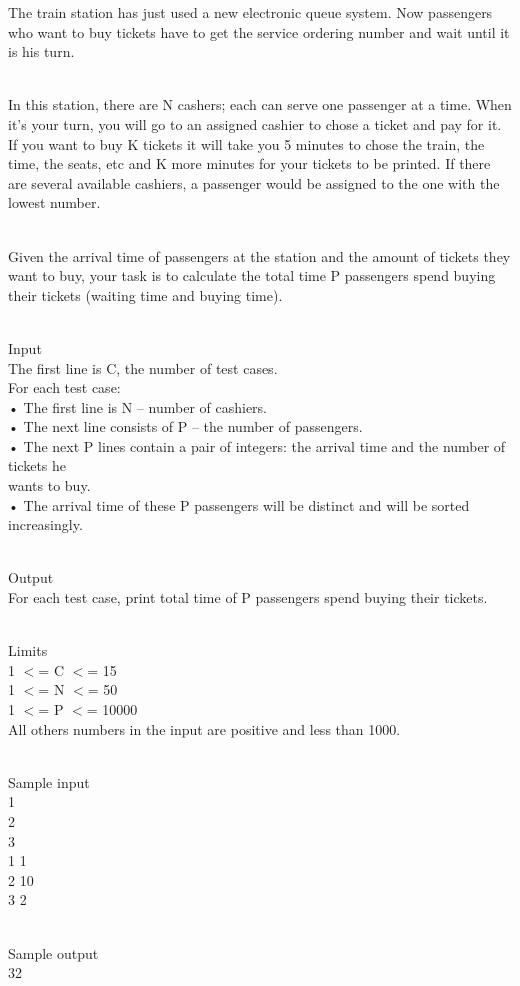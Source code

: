



   The train station has just used a new electronic queue system. Now passengers who want to buy tickets have to get the service ordering number and wait until it is his turn.  


\\   In this station, there are N cashers; each can serve one passenger at a time. When it’s your turn, you will go to an assigned cashier to chose a ticket and pay for it. If you want to buy K tickets it will take you 5 minutes to chose the train, the time, the seats, etc and K more minutes for your tickets to be printed. If there are several available cashiers, a passenger would be assigned to the one with the lowest number.  


\\   Given the arrival time of passengers at the station and the amount of tickets they want to buy, your task is to calculate the total time P passengers spend buying their tickets (waiting time and buying time).  


\\   Input   
\\   The first line is C, the number of test cases.   
\\   For each test case:   
\\   • The first line is N – number of cashiers.   
\\   • The next line consists of P – the number of passengers.   
\\   • The next P lines contain a pair of integers: the arrival time and the number of tickets he   
\\   wants to buy.   
\\   • The arrival time of these P passengers will be distinct and will be sorted increasingly.  


\\   Output   
\\   For each test case, print total time of P passengers spend buying their tickets.  


\\   Limits   
\\   1 $<$= C $<$= 15   
\\   1 $<$= N $<$= 50   
\\   1 $<$= P $<$= 10000   
\\   All others numbers in the input are positive and less than 1000.  


\\   Sample input   
\\   1   
\\   2   
\\   3   
\\   1 1   
\\   2 10   
\\   3 2  


\\   Sample output   
\\   32  